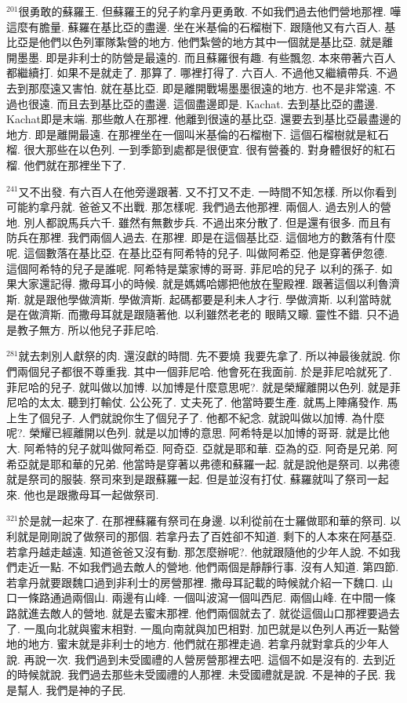 \documentclass{book}
\begin{document}
$^{201}$很勇敢的蘇羅王.
但蘇羅王的兒子約拿丹更勇敢.
不如我們過去他們營地那裡.
嘩 這麼有膽量.
蘇羅在基比亞的盡邊.
坐在米基倫的石榴樹下.
跟隨他又有六百人.
基比亞是他們以色列軍隊紮營的地方.
他們紮營的地方其中一個就是基比亞.
就是離開墨墨.
即是非利士的防營是最遠的.
而且蘇羅很有趣.
有些飄忽.
本來帶著六百人都繼續打.
如果不是就走了.
那算了.
哪裡打得了.
六百人.
不過他又繼續帶兵.
不過去到那麼遠又害怕.
就在基比亞.
即是離開戰場墨墨很遠的地方.
也不是非常遠.
不過也很遠.
而且去到基比亞的盡邊.
這個盡邊即是.
Kachat.
去到基比亞的盡邊.
Kachat即是末端.
那些敵人在那裡.
他離到很遠的基比亞.
還要去到基比亞最盡邊的地方.
即是離開最遠.
在那裡坐在一個叫米基倫的石榴樹下.
這個石榴樹就是紅石榴.
很大那些在以色列.
一到季節到處都是很便宜.
很有營養的.
對身體很好的紅石榴.
他們就在那裡坐下了.

$^{241}$又不出發.
有六百人在他旁邊跟著.
又不打又不走.
一時間不知怎樣.
所以你看到可能約拿丹就.
爸爸又不出戰.
那怎樣呢.
我們過去他那裡.
兩個人.
過去別人的營地.
別人都說馬兵六千.
雖然有無數步兵.
不過出來分散了.
但是還有很多.
而且有防兵在那裡.
我們兩個人過去.
在那裡.
即是在這個基比亞.
這個地方的數落有什麼呢.
這個數落在基比亞.
在基比亞有阿希特的兒子.
叫做阿希亞.
他是穿著伊忽德.
這個阿希特的兒子是誰呢.
阿希特是葉家博的哥哥.
菲尼哈的兒子 以利的孫子.
如果大家還記得.
撒母耳小的時候.
就是媽媽哈娜把他放在聖殿裡.
跟著這個以利魯濟斯.
就是跟他學做濟斯.
學做濟斯.
起碼都要是利未人才行.
學做濟斯.
以利當時就是在做濟斯.
而撒母耳就是跟隨著他.
以利雖然老老的 眼睛又矇.
靈性不錯.
只不過是教子無方.
所以他兒子菲尼哈.

$^{281}$就去刺別人獻祭的肉.
還沒獻的時間.
先不要燒 我要先拿了.
所以神最後就說.
你們兩個兒子都很不尊重我.
其中一個菲尼哈.
他會死在我面前.
於是菲尼哈就死了.
菲尼哈的兒子.
就叫做以加博.
以加博是什麼意思呢?.
就是榮耀離開以色列.
就是菲尼哈的太太.
聽到打輸仗.
公公死了.
丈夫死了.
他當時要生產.
就馬上陣痛發作.
馬上生了個兒子.
人們就說你生了個兒子了.
他都不紀念.
就說叫做以加博.
為什麼呢?.
榮耀已經離開以色列.
就是以加博的意思.
阿希特是以加博的哥哥.
就是比他大.
阿希特的兒子就叫做阿希亞.
阿奇亞.
亞就是耶和華.
亞為的亞.
阿奇是兄弟.
阿希亞就是耶和華的兄弟.
他當時是穿著以弗德和蘇羅一起.
就是說他是祭司.
以弗德就是祭司的服裝.
祭司來到是跟蘇羅一起.
但是並沒有打仗.
蘇羅就叫了祭司一起來.
他也是跟撒母耳一起做祭司.

$^{321}$於是就一起來了.
在那裡蘇羅有祭司在身邊.
以利從前在士羅做耶和華的祭司.
以利就是剛剛說了做祭司的那個.
若拿丹去了百姓卻不知道.
剩下的人本來在阿基亞.
若拿丹越走越遠.
知道爸爸又沒有動.
那怎麼辦呢?.
他就跟隨他的少年人說.
不如我們走近一點.
不如我們過去敵人的營地.
他們兩個是靜靜行事.
沒有人知道.
第四節.
若拿丹就要跟魏口過到非利士的房營那裡.
撒母耳記載的時候就介紹一下魏口.
山口一條路通過兩個山.
兩邊有山峰.
一個叫波瀉一個叫西尼.
兩個山峰.
在中間一條路就進去敵人的營地.
就是去蜜末那裡.
他們兩個就去了.
就從這個山口那裡要過去了.
一風向北就與蜜末相對.
一風向南就與加巴相對.
加巴就是以色列人再近一點營地的地方.
蜜末就是非利士的地方.
他們就在那裡走過.
若拿丹就對拿兵的少年人說.
再說一次.
我們過到未受國禮的人營房營那裡去吧.
這個不如是沒有的.
去到近的時候就說.
我們過去那些未受國禮的人那裡.
未受國禮就是說.
不是神的子民.
我是幫人.
我們是神的子民.
\end{document}
